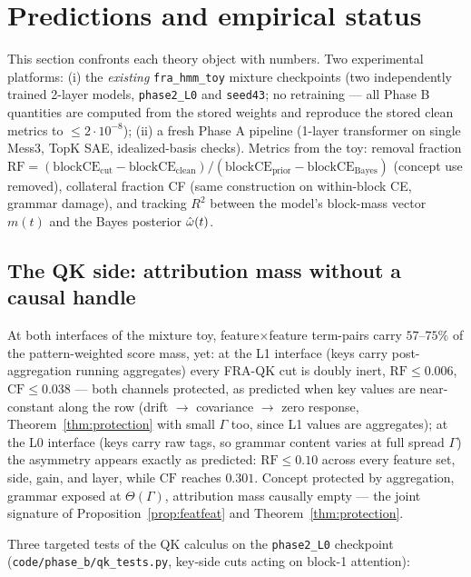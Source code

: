 \documentclass{article}
\begin{document}
\section{Predictions and empirical status}\label{sec:predictions}

This section confronts each theory object with numbers. Two experimental platforms: (i) the \emph{existing} \texttt{fra\_hmm\_toy} mixture checkpoints (two independently trained 2-layer models, \texttt{phase2\_L0} and \texttt{seed43}; no retraining --- all Phase B quantities are computed from the stored weights and reproduce the stored clean metrics to $\le 2\cdot10^{-8}$); (ii) a fresh Phase A pipeline (1-layer transformer on single Mess3, TopK SAE, idealized-basis checks). Metrics from the toy: removal fraction $\mathrm{RF} = (\mathrm{blockCE}_{\mathrm{cut}} - \mathrm{blockCE}_{\mathrm{clean}})/(\mathrm{blockCE}_{\mathrm{prior}} - \mathrm{blockCE}_{\mathrm{Bayes}})$ (concept use removed), collateral fraction CF (same construction on within-block CE, grammar damage), and tracking $R^2$ between the model's block-mass vector $m(t)$ and the Bayes posterior $\hat{\omega}(t)$.

\subsection{The QK side: attribution mass without a causal handle}

At both interfaces of the mixture toy, feature$\times$feature term-pairs carry $57$--$75\%$ of the pattern-weighted score mass, yet: at the L1 interface (keys carry post-aggregation running aggregates) every FRA-QK cut is doubly inert, $\mathrm{RF} \le 0.006$, $\mathrm{CF} \le 0.038$ --- both channels protected, as predicted when key values are near-constant along the row (drift $\to$ covariance $\to$ zero response, Theorem~\ref{thm:protection} with small $\Gamma$ too, since L1 values are aggregates); at the L0 interface (keys carry raw tags, so grammar content varies at full spread $\Gamma$) the asymmetry appears exactly as predicted: $\mathrm{RF} \le 0.10$ across every feature set, side, gain, and layer, while $\mathrm{CF}$ reaches $0.301$. Concept protected by aggregation, grammar exposed at $\Theta(\Gamma)$, attribution mass causally empty --- the joint signature of Proposition~\ref{prop:featfeat} and Theorem~\ref{thm:protection}.

Three targeted tests of the QK calculus on the \texttt{phase2\_L0} checkpoint (\texttt{code/phase\_b/qk\_tests.py}, key-side cuts acting on block-1 attention):
\end{document}

